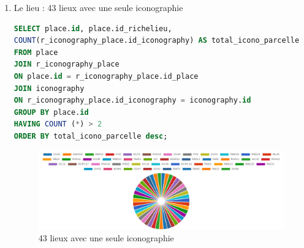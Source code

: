 \begin{enumerate}
\begin{enumerate}
\newpage
\item Le lieu : 43 lieux avec une seule iconographie
            \begin{lstlisting}[language=SQL, caption=Nombre de lieux avec une seule iconographie]
SELECT place.id, place.id_richelieu,  
COUNT(r_iconography_place.id_iconography) AS total_icono_parcelle 
FROM place 
JOIN r_iconography_place 
ON place.id = r_iconography_place.id_place 
JOIN iconography  
ON r_iconography_place.id_iconography = iconography.id 
GROUP BY place.id 
HAVING COUNT (*) > 2
ORDER BY total_icono_parcelle desc; \end{lstlisting}
\begin{figure}[ht!]
                \centering
                \includegraphics[width=1\linewidth]{images/graphiques/nb_icono_lieu_1.png}
                \caption{43 lieux avec une seule iconographie}
                \label{fig:nb_icono_lieu_1}
            \end{figure}    
\end{enumerate}
    

\end{enumerate}

